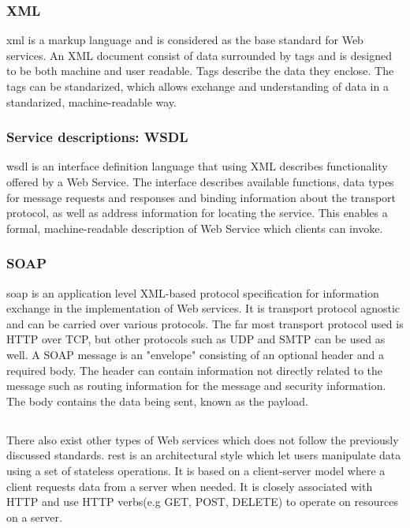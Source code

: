 \subsubsection{XML}

\gls{xml} is a markup language and is considered as the base standard for Web
services. An XML document consist of data surrounded by tags and is designed to
be both machine and user readable. Tags describe the data they enclose. The tags
can be standarized, which allows exchange and understanding of data in a
standarized, machine-readable way.


\subsubsection{Service descriptions: WSDL}

\gls{wsdl} is an interface definition language that using XML describes
functionality offered by a Web Service. The interface describes available
functions, data types for message requests and responses and binding information
about the transport protocol, as well as address information for locating the
service. This enables a formal, machine-readable description of Web Service
which clients can invoke.


\subsubsection{SOAP}

\gls{soap} is an application level XML-based protocol specification for
information exchange in the implementation of Web services. It is transport
protocol agnostic and can be carried over various protocols. The far most
transport protocol used is HTTP over TCP, but other protocols such as UDP and
SMTP can be used as well. A SOAP message is an "envelope" consisting of an
optional header and a required body. The header can contain information not
directly related to the message such as routing information for the message and
security information. The body contains the data being sent, known as the
payload.

\subsection{}
\label{rest}

There also exist other types of Web services which does not follow the
previously discussed standards. \gls{rest} is an architectural style which let
users manipulate data using a set of stateless operations. It is based on a
client-server model where a client requests data from a server when needed. It
is closely associated with HTTP and use HTTP verbs(e.g GET, POST,
DELETE) to operate on resources on a server.

